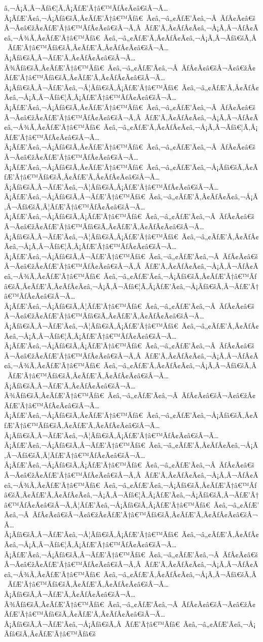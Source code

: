 \documentclass{article}
\begin{document}
\begin{outline}[enumerate]
â‚¬Å¡Ã‚Â¬Ãƒâ€¦Ã‚Â¡ÃƒÆ’Ã†â€™ÃƒÂ¢Ã¢â€šÂ¬Ã…Â¡ÃƒÆ’Ã¢â‚¬Å¡Ãƒâ€šÃ‚Â¢ÃƒÆ’Ã†â€™Ãƒâ€ Ã¢â‚¬â„¢ÃƒÆ’Ã¢â‚¬Â ÃƒÂ¢Ã¢â€šÂ¬Ã¢â€žÂ¢ÃƒÆ’Ã†â€™ÃƒÂ¢Ã¢â€šÂ¬Ã‚Â ÃƒÆ’Ã‚Â¢ÃƒÂ¢Ã¢â‚¬Å¡Ã‚Â¬ÃƒÂ¢Ã¢â‚¬Å¾Ã‚Â¢ÃƒÆ’Ã†â€™Ãƒâ€ Ã¢â‚¬â„¢ÃƒÆ’Ã‚Â¢ÃƒÂ¢Ã¢â‚¬Å¡Ã‚Â¬Ãƒâ€šÃ‚Â ÃƒÆ’Ã†â€™Ãƒâ€šÃ‚Â¢ÃƒÆ’Ã‚Â¢ÃƒÂ¢Ã¢â€šÂ¬Ã…Â¡Ãƒâ€šÃ‚Â¬ÃƒÆ’Ã‚Â¢ÃƒÂ¢Ã¢â€šÂ¬Ã…Â¾Ãƒâ€šÃ‚Â¢ÃƒÆ’Ã†â€™Ãƒâ€ Ã¢â‚¬â„¢ÃƒÆ’Ã¢â‚¬Â ÃƒÂ¢Ã¢â€šÂ¬Ã¢â€žÂ¢ÃƒÆ’Ã†â€™Ãƒâ€šÃ‚Â¢ÃƒÆ’Ã‚Â¢ÃƒÂ¢Ã¢â€šÂ¬Ã…Â¡Ãƒâ€šÃ‚Â¬ÃƒÆ’Ã¢â‚¬Â¦Ãƒâ€šÃ‚Â¡ÃƒÆ’Ã†â€™Ãƒâ€ Ã¢â‚¬â„¢ÃƒÆ’Ã‚Â¢ÃƒÂ¢Ã¢â‚¬Å¡Ã‚Â¬Ãƒâ€¦Ã‚Â¡ÃƒÆ’Ã†â€™ÃƒÂ¢Ã¢â€šÂ¬Ã…Â¡ÃƒÆ’Ã¢â‚¬Å¡Ãƒâ€šÃ‚Â¢ÃƒÆ’Ã†â€™Ãƒâ€ Ã¢â‚¬â„¢ÃƒÆ’Ã¢â‚¬Â ÃƒÂ¢Ã¢â€šÂ¬Ã¢â€žÂ¢ÃƒÆ’Ã†â€™ÃƒÂ¢Ã¢â€šÂ¬Ã‚Â ÃƒÆ’Ã‚Â¢ÃƒÂ¢Ã¢â‚¬Å¡Ã‚Â¬ÃƒÂ¢Ã¢â‚¬Å¾Ã‚Â¢ÃƒÆ’Ã†â€™Ãƒâ€ Ã¢â‚¬â„¢ÃƒÆ’Ã‚Â¢ÃƒÂ¢Ã¢â‚¬Å¡Ã‚Â¬Ãƒâ€¦Ã‚Â¡ÃƒÆ’Ã†â€™ÃƒÂ¢Ã¢â€šÂ¬Ã…Â¡ÃƒÆ’Ã¢â‚¬Å¡Ãƒâ€šÃ‚Â¢ÃƒÆ’Ã†â€™Ãƒâ€ Ã¢â‚¬â„¢ÃƒÆ’Ã¢â‚¬Â ÃƒÂ¢Ã¢â€šÂ¬Ã¢â€žÂ¢ÃƒÆ’Ã†â€™ÃƒÂ¢Ã¢â€šÂ¬Ã…Â¡ÃƒÆ’Ã¢â‚¬Å¡Ãƒâ€šÃ‚Â¢ÃƒÆ’Ã†â€™Ãƒâ€ Ã¢â‚¬â„¢ÃƒÆ’Ã¢â‚¬Å¡Ãƒâ€šÃ‚Â¢ÃƒÆ’Ã†â€™Ãƒâ€šÃ‚Â¢ÃƒÆ’Ã‚Â¢ÃƒÂ¢Ã¢â€šÂ¬Ã…Â¡Ãƒâ€šÃ‚Â¬ÃƒÆ’Ã¢â‚¬Â¦Ãƒâ€šÃ‚Â¡ÃƒÆ’Ã†â€™ÃƒÂ¢Ã¢â€šÂ¬Ã…Â¡ÃƒÆ’Ã¢â‚¬Å¡Ãƒâ€šÃ‚Â¬ÃƒÆ’Ã†â€™Ãƒâ€ Ã¢â‚¬â„¢ÃƒÆ’Ã‚Â¢ÃƒÂ¢Ã¢â‚¬Å¡Ã‚Â¬Ãƒâ€šÃ‚Â¦ÃƒÆ’Ã†â€™ÃƒÂ¢Ã¢â€šÂ¬Ã…Â¡ÃƒÆ’Ã¢â‚¬Å¡Ãƒâ€šÃ‚Â¡ÃƒÆ’Ã†â€™Ãƒâ€ Ã¢â‚¬â„¢ÃƒÆ’Ã¢â‚¬Â ÃƒÂ¢Ã¢â€šÂ¬Ã¢â€žÂ¢ÃƒÆ’Ã†â€™Ãƒâ€šÃ‚Â¢ÃƒÆ’Ã‚Â¢ÃƒÂ¢Ã¢â€šÂ¬Ã…Â¡Ãƒâ€šÃ‚Â¬ÃƒÆ’Ã¢â‚¬Â¦Ãƒâ€šÃ‚Â¡ÃƒÆ’Ã†â€™Ãƒâ€ Ã¢â‚¬â„¢ÃƒÆ’Ã‚Â¢ÃƒÂ¢Ã¢â‚¬Å¡Ã‚Â¬Ãƒâ€¦Ã‚Â¡ÃƒÆ’Ã†â€™ÃƒÂ¢Ã¢â€šÂ¬Ã…Â¡ÃƒÆ’Ã¢â‚¬Å¡Ãƒâ€šÃ‚Â¬ÃƒÆ’Ã†â€™Ãƒâ€ Ã¢â‚¬â„¢ÃƒÆ’Ã¢â‚¬Â ÃƒÂ¢Ã¢â€šÂ¬Ã¢â€žÂ¢ÃƒÆ’Ã†â€™ÃƒÂ¢Ã¢â€šÂ¬Ã‚Â ÃƒÆ’Ã‚Â¢ÃƒÂ¢Ã¢â‚¬Å¡Ã‚Â¬ÃƒÂ¢Ã¢â‚¬Å¾Ã‚Â¢ÃƒÆ’Ã†â€™Ãƒâ€ Ã¢â‚¬â„¢ÃƒÆ’Ã¢â‚¬Å¡Ãƒâ€šÃ‚Â¢ÃƒÆ’Ã†â€™Ãƒâ€šÃ‚Â¢ÃƒÆ’Ã‚Â¢ÃƒÂ¢Ã¢â‚¬Å¡Ã‚Â¬Ãƒâ€¦Ã‚Â¡ÃƒÆ’Ã¢â‚¬Å¡Ãƒâ€šÃ‚Â¬ÃƒÆ’Ã†â€™ÃƒÂ¢Ã¢â€šÂ¬Ã…Â¡ÃƒÆ’Ã¢â‚¬Å¡Ãƒâ€šÃ‚Â¦ÃƒÆ’Ã†â€™Ãƒâ€ Ã¢â‚¬â„¢ÃƒÆ’Ã¢â‚¬Â ÃƒÂ¢Ã¢â€šÂ¬Ã¢â€žÂ¢ÃƒÆ’Ã†â€™Ãƒâ€šÃ‚Â¢ÃƒÆ’Ã‚Â¢ÃƒÂ¢Ã¢â€šÂ¬Ã…Â¡Ãƒâ€šÃ‚Â¬ÃƒÆ’Ã¢â‚¬Â¦Ãƒâ€šÃ‚Â¡ÃƒÆ’Ã†â€™Ãƒâ€ Ã¢â‚¬â„¢ÃƒÆ’Ã‚Â¢ÃƒÂ¢Ã¢â‚¬Å¡Ã‚Â¬Ãƒâ€¦Ã‚Â¡ÃƒÆ’Ã†â€™ÃƒÂ¢Ã¢â€šÂ¬Ã…Â¡ÃƒÆ’Ã¢â‚¬Å¡Ãƒâ€šÃ‚Â¡ÃƒÆ’Ã†â€™Ãƒâ€ Ã¢â‚¬â„¢ÃƒÆ’Ã¢â‚¬Â ÃƒÂ¢Ã¢â€šÂ¬Ã¢â€žÂ¢ÃƒÆ’Ã†â€™ÃƒÂ¢Ã¢â€šÂ¬Ã‚Â ÃƒÆ’Ã‚Â¢ÃƒÂ¢Ã¢â‚¬Å¡Ã‚Â¬ÃƒÂ¢Ã¢â‚¬Å¾Ã‚Â¢ÃƒÆ’Ã†â€™Ãƒâ€ Ã¢â‚¬â„¢ÃƒÆ’Ã‚Â¢ÃƒÂ¢Ã¢â‚¬Å¡Ã‚Â¬Ãƒâ€šÃ‚Â ÃƒÆ’Ã†â€™Ãƒâ€šÃ‚Â¢ÃƒÆ’Ã‚Â¢ÃƒÂ¢Ã¢â€šÂ¬Ã…Â¡Ãƒâ€šÃ‚Â¬ÃƒÆ’Ã‚Â¢ÃƒÂ¢Ã¢â€šÂ¬Ã…Â¾Ãƒâ€šÃ‚Â¢ÃƒÆ’Ã†â€™Ãƒâ€ Ã¢â‚¬â„¢ÃƒÆ’Ã¢â‚¬Â ÃƒÂ¢Ã¢â€šÂ¬Ã¢â€žÂ¢ÃƒÆ’Ã†â€™ÃƒÂ¢Ã¢â€šÂ¬Ã…Â¡ÃƒÆ’Ã¢â‚¬Å¡Ãƒâ€šÃ‚Â¢ÃƒÆ’Ã†â€™Ãƒâ€ Ã¢â‚¬â„¢ÃƒÆ’Ã¢â‚¬Å¡Ãƒâ€šÃ‚Â¢ÃƒÆ’Ã†â€™Ãƒâ€šÃ‚Â¢ÃƒÆ’Ã‚Â¢ÃƒÂ¢Ã¢â€šÂ¬Ã…Â¡Ãƒâ€šÃ‚Â¬ÃƒÆ’Ã¢â‚¬Â¦Ãƒâ€šÃ‚Â¡ÃƒÆ’Ã†â€™ÃƒÂ¢Ã¢â€šÂ¬Ã…Â¡ÃƒÆ’Ã¢â‚¬Å¡Ãƒâ€šÃ‚Â¬ÃƒÆ’Ã†â€™Ãƒâ€ Ã¢â‚¬â„¢ÃƒÆ’Ã‚Â¢ÃƒÂ¢Ã¢â‚¬Å¡Ã‚Â¬Ãƒâ€šÃ‚Â¦ÃƒÆ’Ã†â€™ÃƒÂ¢Ã¢â€šÂ¬Ã…Â¡ÃƒÆ’Ã¢â‚¬Å¡Ãƒâ€šÃ‚Â¡ÃƒÆ’Ã†â€™Ãƒâ€ Ã¢â‚¬â„¢ÃƒÆ’Ã¢â‚¬Â ÃƒÂ¢Ã¢â€šÂ¬Ã¢â€žÂ¢ÃƒÆ’Ã†â€™ÃƒÂ¢Ã¢â€šÂ¬Ã‚Â ÃƒÆ’Ã‚Â¢ÃƒÂ¢Ã¢â‚¬Å¡Ã‚Â¬ÃƒÂ¢Ã¢â‚¬Å¾Ã‚Â¢ÃƒÆ’Ã†â€™Ãƒâ€ Ã¢â‚¬â„¢ÃƒÆ’Ã¢â‚¬Å¡Ãƒâ€šÃ‚Â¢ÃƒÆ’Ã†â€™Ãƒâ€šÃ‚Â¢ÃƒÆ’Ã‚Â¢ÃƒÂ¢Ã¢â‚¬Å¡Ã‚Â¬Ãƒâ€¦Ã‚Â¡ÃƒÆ’Ã¢â‚¬Å¡Ãƒâ€šÃ‚Â¬ÃƒÆ’Ã†â€™ÃƒÂ¢Ã¢â€šÂ¬Ã‚Â¦ÃƒÆ’Ã¢â‚¬Å¡Ãƒâ€šÃ‚Â¡ÃƒÆ’Ã†â€™Ãƒâ€ Ã¢â‚¬â„¢ÃƒÆ’Ã¢â‚¬Â ÃƒÂ¢Ã¢â€šÂ¬Ã¢â€žÂ¢ÃƒÆ’Ã†â€™Ãƒâ€šÃ‚Â¢ÃƒÆ’Ã‚Â¢ÃƒÂ¢Ã¢â€šÂ¬Ã…Â¡Ãƒâ€šÃ‚Â¬ÃƒÆ’Ã¢â‚¬Â¦Ãƒâ€šÃ‚Â¡ÃƒÆ’Ã†â€™Ãƒâ€ Ã¢â‚¬â„¢ÃƒÆ’Ã‚Â¢ÃƒÂ¢Ã¢â‚¬Å¡Ã‚Â¬Ãƒâ€¦Ã‚Â¡ÃƒÆ’Ã†â€™ÃƒÂ¢Ã¢â€šÂ¬Ã…Â¡ÃƒÆ’Ã¢â‚¬Å¡Ãƒâ€šÃ‚Â¬ÃƒÆ’Ã†â€™Ãƒâ€ Ã¢â‚¬â„¢ÃƒÆ’Ã¢â‚¬Â ÃƒÂ¢Ã¢â€šÂ¬Ã¢â€žÂ¢ÃƒÆ’Ã†â€™ÃƒÂ¢Ã¢â€šÂ¬Ã‚Â ÃƒÆ’Ã‚Â¢ÃƒÂ¢Ã¢â‚¬Å¡Ã‚Â¬ÃƒÂ¢Ã¢â‚¬Å¾Ã‚Â¢ÃƒÆ’Ã†â€™Ãƒâ€ Ã¢â‚¬â„¢ÃƒÆ’Ã‚Â¢ÃƒÂ¢Ã¢â‚¬Å¡Ã‚Â¬Ãƒâ€šÃ‚Â ÃƒÆ’Ã†â€™Ãƒâ€šÃ‚Â¢ÃƒÆ’Ã‚Â¢ÃƒÂ¢Ã¢â€šÂ¬Ã…Â¡Ãƒâ€šÃ‚Â¬ÃƒÆ’Ã‚Â¢ÃƒÂ¢Ã¢â€šÂ¬Ã…Â¾Ãƒâ€šÃ‚Â¢ÃƒÆ’Ã†â€™Ãƒâ€ Ã¢â‚¬â„¢ÃƒÆ’Ã¢â‚¬Â ÃƒÂ¢Ã¢â€šÂ¬Ã¢â€žÂ¢ÃƒÆ’Ã†â€™Ãƒâ€šÃ‚Â¢ÃƒÆ’Ã‚Â¢ÃƒÂ¢Ã¢â€šÂ¬Ã…Â¡Ãƒâ€šÃ‚Â¬ÃƒÆ’Ã¢â‚¬Å¡Ãƒâ€šÃ‚Â ÃƒÆ’Ã†â€™Ãƒâ€ Ã¢â‚¬â„¢ÃƒÆ’Ã¢â‚¬Å¡Ãƒâ€šÃ‚Â¢ÃƒÆ’Ã†â€™Ãƒâ€š
\end{outline}
\end{document}
